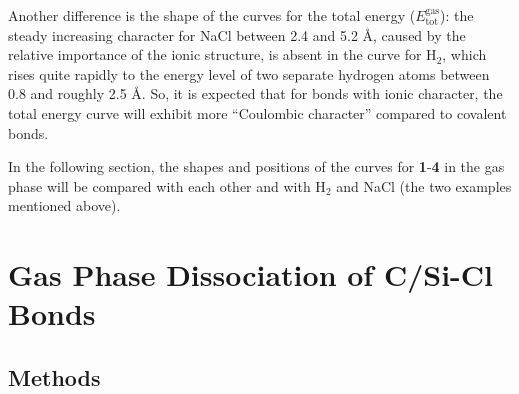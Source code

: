 Another difference is the shape of the curves for the total energy ($E_\mathrm{tot}^\mathrm{gas}$): the steady increasing character for NaCl between 2.4 and 5.2 \AA, caused by the relative importance of the ionic structure, is absent in the curve for H$_2$, which rises quite rapidly to the energy level of two separate hydrogen atoms between 0.8 and roughly 2.5 \AA. So, it is expected that for bonds with ionic character, the total energy curve will exhibit more ``Coulombic character'' compared to covalent bonds. 

In the following section, the shapes and positions of the curves for \textbf{1}-\textbf{4} in the gas phase will be compared with each other and with H$_2$ and NaCl (the two examples mentioned above).

\section{\label{ch3.sec.gasphase}Gas Phase Dissociation of C/Si-Cl Bonds}

\subsection{Methods}

